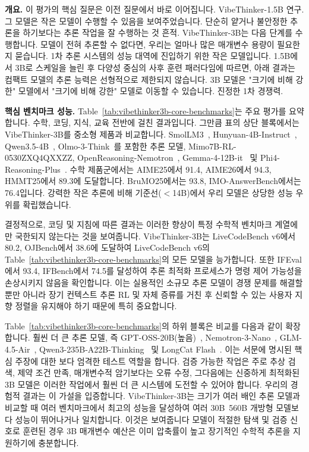 \documentclass{article}
\begin{document}
\textbf{개요.}
이 평가의 핵심 질문은 이전 질문에서 바로 이어집니다.
VibeThinker-1.5B 연구. 그 모델은 작은 모델이 수행할 수 있음을 보여주었습니다.
단순히 얕거나 불안정한 추론을 하기보다는 추론 작업을 잘 수행하는 것
흔적. VibeThinker-3B는 다음 단계를 수행합니다.
모델이 전혀 추론할 수 없다면, 우리는 얼마나 많은 매개변수 용량이 필요한지 묻습니다.
1차 추론 시스템의 성능 대역에 진입하기 위한 작은 모델입니다.
1.5B에서 3B로 스케일을 늘린 후
다양성 중심의 사후 훈련 패러다임에 따르면, 아래 결과는
컴팩트 모델의 추론 능력은 선형적으로 제한되지 않습니다.
3B 모델은 "크기에 비해 강한" 모델에서 "크기에 비해 강한" 모델로 이동할 수 있습니다.
진정한 1차 경쟁력.



\textbf{핵심 벤치마크 성능.}
Table~\ref{tab:vibethinker3b-core-benchmarks}는 주요 평가를 요약합니다.
수학, 코딩, 지식, 교육 전반에 걸친 결과입니다. 그만큼
표의 상단 블록에서는 VibeThinker-3B를 중소형 제품과 비교합니다.
SmolLM3~\cite{bakouch2025smollm3}, Hunyuan-4B-Instruct~\cite{tencent2025hunyuan4binstruct}, Qwen3.5-4B~\cite{qwen3.5}, Olmo-3-Think~\cite{olmo2025olmo3}를 포함한 추론 모델,
Mimo7B-RL-0530ZXQ4QXXZZ\cite{coreteam2025mimo7B}, OpenReasoning-Nemotron~\cite{majumdar2025openreasoningnemotron}, Gemma-4-12B-it~\cite{google2026gemma412b} 및 Phi4-Reasoning-Plus~\cite{abdin2025phi4}.
수학 제품군에서는 AIME25에서 91.4, AIME26에서 94.3, HMMT25에서 89.3에 도달합니다.
BruMO25에서는 93.8, IMO-AnswerBench에서는 76.4입니다. 강력한 작은 추론에 비해
기준선($<$14B)에서 우리 모델은 상당한 성능 우위를 확립했습니다.

결정적으로, 코딩 및 지침에 따른 결과는 이러한 향상이 특정 수학적 벤치마크 계열에만 국한되지 않는다는 것을 보여줍니다. VibeThinker-3B는 LiveCodeBench v6에서 80.2, OJBench에서 38.6에 도달하여 LiveCodeBench v6의 Table~\ref{tab:vibethinker3b-core-benchmarks}의 모든 모델을 능가합니다. 또한 IFEval에서 93.4, IFBench에서 74.5를 달성하여 추론 최적화 프로세스가 명령 제어 가능성을 손상시키지 않음을 확인합니다. 이는 실용적인 소규모 추론 모델이 경쟁 문제를 해결할 뿐만 아니라 장기 컨텍스트 추론 RL 및 자체 증류를 거친 후 신뢰할 수 있는 사용자 지향 정렬을 유지해야 하기 때문에 특히 중요합니다.

Table~\ref{tab:vibethinker3b-core-benchmarks}의 하위 블록은 비교를 다음과 같이 확장합니다.
훨씬 더 큰 추론 모델, 즉 GPT-OSS-20B(높음)~\cite{agarwal2025gptoss},
Nemotron-3-Nano~\cite{blakeman2025nemotron3nano}, GLM-4.5-Air~\cite{zeng2025glm4.5glm4.5air}, Qwen3-235B-A22B-Thinking~\cite{qwen3technicalreport} 및 LongCat Flash~\cite{team2025longcat}.
이는 서문에 명시된 핵심 주장에 대한 보다 엄격한 테스트 역할을 합니다.
검증 가능한 작업은 주로 추상 검색, 제약 조건 만족,
매개변수적 암기보다는 오류 수정, 그다음에는 신중하게
최적화된 3B 모델은 이러한 작업에서 훨씬 더 큰 시스템에 도전할 수 있어야 합니다. 우리의 경험적 결과는 이 가설을 입증합니다. VibeThinker-3B는 크기가 여러 배인 추론 모델과 비교할 때 여러 벤치마크에서 최고의 성능을 달성하여 여러 30B~560B 개방형 모델보다 성능이 뛰어나거나 일치합니다. 이것은 보여줍니다
모델이 적절한 탐색 및 검증 신호로 훈련된 경우 3B 매개변수 예산은 이미 압축률이 높고 장기적인 수학적 추론을 지원하기에 충분합니다.
\end{document}
